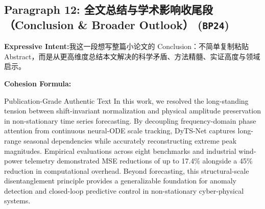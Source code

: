 \subsection*{Paragraph 12: 全文总结与学术影响收尾段（Conclusion \& Broader Outlook） (\texttt{BP24})}
\noindent\textbf{Expressive Intent:}\enspace 我这一段想写整篇小论文的 Conclusion：不简单复制粘贴 Abstract，而是从更高维度总结本文解决的科学矛盾、方法精髓、实证高度与领域启示。\par
\noindent\textbf{Cohesion Formula:}\par\vspace{4pt}
\begin{ExampleBox}{Publication-Grade Authentic Text}
In this work, we resolved the long-standing tension between shift-invariant normalization and physical amplitude preservation in non-stationary time series forecasting. By decoupling frequency-domain phase attention from continuous neural-ODE scale tracking, DyTS-Net captures long-range seasonal dependencies while accurately reconstructing extreme peak magnitudes. Empirical evaluations across eight benchmarks and industrial wind-power telemetry demonstrated MSE reductions of up to 17.4\% alongside a 45\% reduction in computational overhead. Beyond forecasting, this structural-scale disentanglement principle provides a generalizable foundation for anomaly detection and closed-loop predictive control in non-stationary cyber-physical systems.
\end{ExampleBox}
